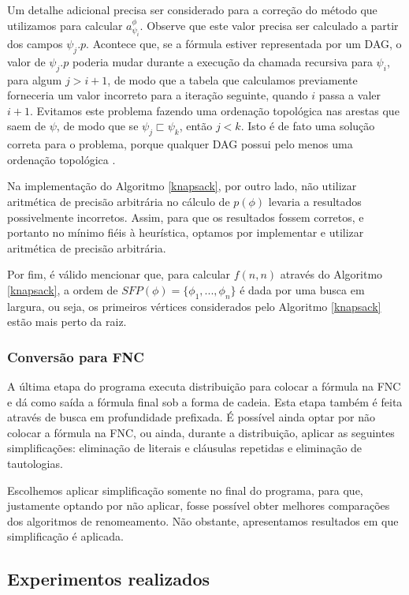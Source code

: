 Um detalhe adicional precisa ser considerado para a correção do método que utilizamos para calcular $a_{\psi_i}^\phi$. Observe que este valor precisa ser calculado a partir dos campos $\psi_j.p$. Acontece que, se a fórmula estiver representada por um DAG, o valor de $\psi_j.p$ poderia mudar durante a execução da chamada recursiva para $\psi_i$, para algum $j > i+1$, de modo que a tabela que calculamos previamente forneceria um valor incorreto para a iteração seguinte, quando $i$ passa a valer $i+1$. Evitamos este problema fazendo uma ordenação topológica nas arestas que saem de $\psi$, de modo que se $\psi_j \sqsubset \psi_k$, então $j < k$. Isto é de fato uma solução correta para o problema, porque qualquer DAG possui pelo menos uma ordenação topológica \cite{CLRS09}.

Na implementação do Algoritmo \ref{knapsack}, por outro lado, não utilizar aritmética de precisão arbitrária no cálculo de $p(\phi)$ levaria a resultados possivelmente incorretos. Assim, para que os resultados fossem corretos, e portanto no mínimo fiéis à heurística, optamos por implementar e utilizar aritmética de precisão arbitrária.

Por fim, é válido mencionar que, para calcular $f(n,n)$ através do Algoritmo \ref{knapsack}, a ordem de $SFP(\phi) = \{\phi_1,...,\phi_n \}$ é dada por uma busca em largura, ou seja, os primeiros vértices considerados pelo Algoritmo \ref{knapsack} estão mais perto da raiz.

\subsubsection{Conversão para FNC}

\indent

A última etapa do programa executa distribuição para colocar a fórmula na FNC e dá como saída a fórmula final sob a forma de cadeia. Esta etapa também é feita através de busca em profundidade prefixada. É possível ainda optar por não colocar a fórmula na FNC, ou ainda, durante a distribuição, aplicar as seguintes simplificações: eliminação de literais e cláusulas repetidas e eliminação de tautologias.

Escolhemos aplicar simplificação somente no final do programa, para que, justamente optando por não aplicar, fosse possível obter melhores comparações dos algoritmos de renomeamento. Não obstante, apresentamos resultados em que simplificação é aplicada.

\subsection{Experimentos realizados}


